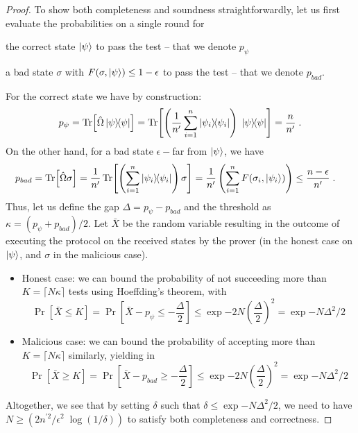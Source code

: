 \documentclass[11pt]{article}
\begin{document}
\begin{proof}
    To show both completeness and soundness straightforwardly, let us first evaluate the probabilities on a single round for \begin{enumerate*}[label=\roman*)]
        \item the correct state $\ket\psi$ to pass the test -- that we denote $p_\psi$
        \item a bad state $\sigma$ with $F(\sigma, \ket\psi)\leq 1-\epsilon$ to pass the test -- that we denote $p_{bad}$.
    \end{enumerate*}
    For the correct state we have by construction:
    \begin{equation}
        p_{\psi}
        =
        \Tr[\hat \Omega \ketbra \psi] = \Tr[
            \left( \dfrac{1}{n'}
            \sum_{i=1}^n
            \ketbra{\psi_i} \right)
            \;
            \ketbra{\psi}
        ]
        =
        \dfrac{n}{n'}\; .
    \end{equation}
    On the other hand, for a bad state $\epsilon-$far from $\ket\psi$, we have
    \begin{align}
        p_{bad} &= \Tr[\hat\Omega \sigma]
        = \dfrac{1}{n'}\Tr[\left( \sum_{i=1}^n \ketbra{\psi_i} \right)\sigma]
        = \dfrac{1}{n'}
        \left( \sum_{i=1}^n F(\sigma_i, \ket{\psi_i}) \right)
        \leq 
        \dfrac{n-\epsilon}{n'}\; .
    \end{align}
    Thus, let us define the gap $\Delta = p_\psi-p_{bad}$ and the threshold as $\kappa= (p_\psi+p_{bad})/2$. 
    Let $\bar X$ be the random variable resulting in the outcome of executing the protocol on the received states by the prover (in the honest case on $\ket\psi$, and $\sigma$ in the malicious case).
    \begin{itemize}
        \item Honest case: we can bound the probability of not succeeding more than $K=\lceil N\kappa\rceil$ tests using Hoeffding's theorem, with
        \begin{equation}
            \Pr[\bar X \leq K] = \Pr[\bar X - p_\psi \leq -\dfrac{\Delta}{2}] \leq \exp{
                -2N (\dfrac{\Delta}{2})^2
            }
            =
            \exp{-N\Delta^2/2}
        \end{equation}
        \item Malicious case: we can bound the probability of accepting more than $K=\lceil N\kappa\rceil$ similarly, yielding in
        \begin{equation}
            \Pr[\bar X \geq K] = \Pr[\bar X - p_{bad} \geq -\dfrac{\Delta}{2}] \leq \exp{
                -2N (\dfrac{\Delta}{2})^2
            }
            =
            \exp{-N\Delta^2/2}
        \end{equation}
    \end{itemize}
    Altogether, we see that by setting $\delta$ such that $\delta \leq \exp{-N\Delta^2/2}$, we need to have $N\geq (2n^{\prime 2}/\epsilon^2 \; \log(1/\delta))$ to satisfy both completeness and correctness.


\end{proof}
\newpage


\end{document}
